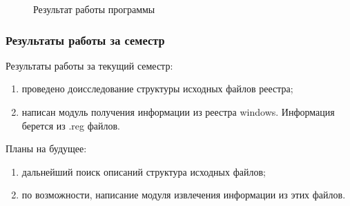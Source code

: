 \begin{figure}[h!]
\caption{Результат работы программы}
\label{lob_7:lob_7}
\end{figure} 

\subsubsection{Результаты работы за семестр}

Результаты работы за текущий семестр:

\begin{enumerate}
  \item проведено доисследование структуры исходных файлов реестра;
  \item написан модуль получения информации из реестра windows. Информация берется из .reg файлов.
\end{enumerate}

Планы на будущее:

\begin{enumerate}
  \item дальнейший поиск описаний структура исходных файлов;
  \item по возможности, написание модуля извлечения информации из этих файлов.
\end{enumerate}

\clearpage






